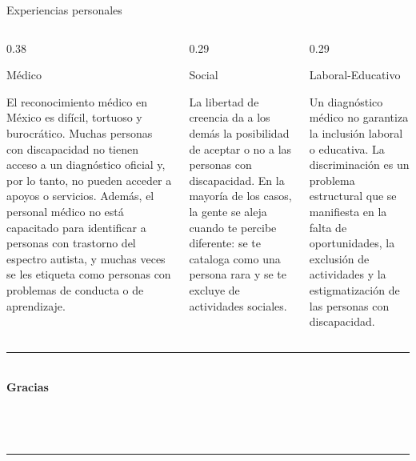 \begin{frame}{Experiencias personales}
  \begin{columns}[T,onlytextwidth]
    \begin{column}{0.38\textwidth}
      \begin{block}{Médico}
        {\footnotesize\raggedright
        El reconocimiento médico en México es difícil, tortuoso y burocrático.
        Muchas personas con discapacidad no tienen acceso a un diagnóstico
        oficial y, por lo tanto, no pueden acceder a apoyos o servicios.
        Además, el personal médico no está capacitado para identificar a
        personas con trastorno del espectro autista, y muchas veces se les
        etiqueta como personas con problemas de conducta o de aprendizaje.\par}
      \end{block}
    \end{column}
    \begin{column}{0.29\textwidth}
      \begin{block}{Social}
        {\footnotesize\raggedright
        La libertad de creencia da a los demás la posibilidad de aceptar o no
        a las personas con discapacidad. En la mayoría de los casos, la gente
        se aleja cuando te percibe diferente: se te cataloga como una persona
        rara y se te excluye de actividades sociales.\par}
      \end{block}
    \end{column}
    \begin{column}{0.29\textwidth}
      \begin{block}{Laboral-Educativo}
        {\footnotesize\raggedright
        Un diagnóstico médico no garantiza la inclusión laboral o educativa.
        La discriminación es un problema estructural que se manifiesta en la
        falta de oportunidades, la exclusión de actividades y la
        estigmatización de las personas con discapacidad.\par}
      \end{block}
    \end{column}
  \end{columns}
\end{frame}


\begin{frame}[plain]
  \begin{center}
    \vfill
    {\color{ColorAcento}\rule{0.6\textwidth}{1.5pt}}\\[0.5cm]
    {\Large\bfseries\color{ColorPrincipal} Gracias}\\[0.3cm]
    {\normalsize \Autor}\\[0.1cm]
    {\small \MateriaCorta}\\[0.1cm]
    {\small \Semestre}\\[0.5cm]
    {\color{ColorAcento}\rule{0.6\textwidth}{1.5pt}}
    \vfill
  \end{center}
\end{frame}
